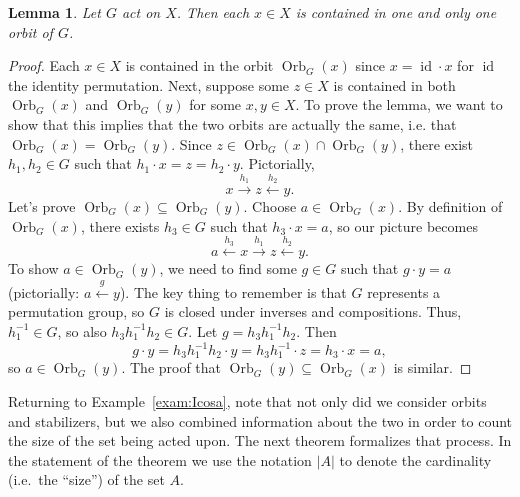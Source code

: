 \documentclass[11pt]{amsart}
\theoremstyle{plain}
\newtheorem*{lemma*}{Lemma}
\theoremstyle{definition}
\theoremstyle{remark}
\DeclareMathOperator{\id}{id}
\DeclareMathOperator{\Orb}{Orb}
\begin{document}
\begin{lemma*}
Let $G$ act on $X$. Then each $x\in X$ is contained in one and only one orbit of $G$.
\end{lemma*}
\begin{proof}
Each $x\in X$ is contained in the orbit $\Orb_G(x)$ since $x = \id\cdot x$ for $\id$ the identity permutation. Next, suppose some $z\in X$ is contained in both $\Orb_G(x)$ and $\Orb_G(y)$ for some $x,y\in  X$. To prove the lemma, we want to show that this implies that the two orbits are actually the same, i.e. that $\Orb_G(x)=\Orb_G(y)$. Since $z\in \Orb_G(x)\cap\Orb_G(y)$, there exist $h_1,h_2 \in G$ such that $h_1\cdot x = z = h_2\cdot y$. Pictorially, \[x \overset{h_1}{\rightarrow} z \overset{h_2}{\leftarrow} y. \]
Let's prove $\Orb_G(x)\subseteq\Orb_G(y)$. Choose $a\in \Orb_G(x)$. By definition of $\Orb_G(x)$, there exists $h_3\in G$ such that $h_3\cdot x = a$, so our picture becomes \[a \overset{h_3}{\leftarrow} x \overset{h_1}{\rightarrow} z \overset{h_2}{\leftarrow} y. \]
To show $a\in \Orb_G(y)$, we need to find some $g\in G$ such that $g\cdot y = a$ (pictorially: $a \overset{g}{\leftarrow} y$).
The key thing to remember is that $G$ represents a permutation group, so $G$ is closed under inverses and compositions.  Thus, $h_1^{-1} \in G$, so also $h_3h_1^{-1}h_2\in G$. Let $g = h_3h_1^{-1}h_2$. Then \[g\cdot y = h_3h_1^{-1}h_2\cdot y = h_3h_1^{-1}\cdot z = h_3\cdot x = a,\]
so $a\in \Orb_G(y)$. The proof that $\Orb_G(y)\subseteq\Orb_G(x)$ is similar.
\end{proof}

Returning to Example~\ref{exam:Icosa}, note that not only did we consider orbits and stabilizers, but we also combined information about the two in order to count the size of the set being acted upon. The next theorem formalizes that process. In the statement of the theorem we use the notation $|A|$ to denote the cardinality (i.e.~the ``size'') of the set $A$.
\end{document}
